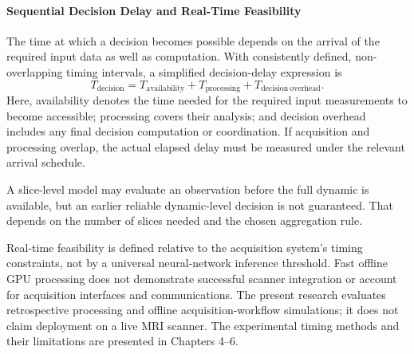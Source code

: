 \paragraph{Sequential Decision Delay and Real-Time Feasibility}
The time at which a decision becomes possible depends on the arrival of the required input data as well as computation. With consistently defined, non-overlapping timing intervals, a simplified decision-delay expression is
\begin{equation}
T_{\mathrm{decision}}=
T_{\mathrm{availability}}+
T_{\mathrm{processing}}+
T_{\mathrm{decision\ overhead}}.
\end{equation}
Here, availability denotes the time needed for the required input measurements to become accessible; processing covers their analysis; and decision overhead includes any final decision computation or coordination. If acquisition and processing overlap, the actual elapsed delay must be measured under the relevant arrival schedule.

A slice-level model may evaluate an observation before the full dynamic is available, but an earlier reliable dynamic-level decision is not guaranteed. That depends on the number of slices needed and the chosen aggregation rule.

Real-time feasibility is defined relative to the acquisition system's timing constraints, not by a universal neural-network inference threshold. Fast offline GPU processing does not demonstrate successful scanner integration or account for acquisition interfaces and communications. The present research evaluates retrospective processing and offline acquisition-workflow simulations; it does not claim deployment on a live MRI scanner. The experimental timing methods and their limitations are presented in Chapters 4--6.

